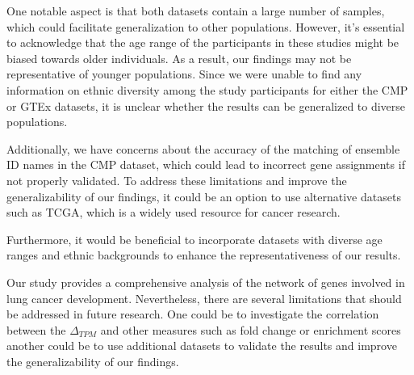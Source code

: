 One notable aspect is that both datasets contain a large number of samples,
which could facilitate generalization to other populations.
However, it's essential to acknowledge that the age range of the participants in these studies might be biased towards older individuals.
As a result, our findings may not be representative of younger populations.
Since we were unable to find any information on ethnic diversity among the study participants for either the CMP or GTEx datasets,
it is unclear whether the results can be generalized to diverse populations.

Additionally, we have concerns about the accuracy of the matching of ensemble ID names in the CMP dataset,
which could lead to incorrect gene assignments if not properly validated.
To address these limitations and improve the generalizability of our findings,
it could be an option to use alternative datasets such as TCGA, which is a widely used resource for cancer research.

Furthermore, it would be beneficial to incorporate datasets with diverse age ranges
and ethnic backgrounds to enhance the representativeness of our results.


Our study provides a comprehensive analysis of the network of genes involved in lung cancer development.
Nevertheless, there are several limitations that should be addressed in future research.
One could be to investigate the correlation between the $\Delta_{TPM}$ and other measures such as fold change or enrichment scores
another could be to use additional datasets to validate the results and improve the generalizability of our findings.\\